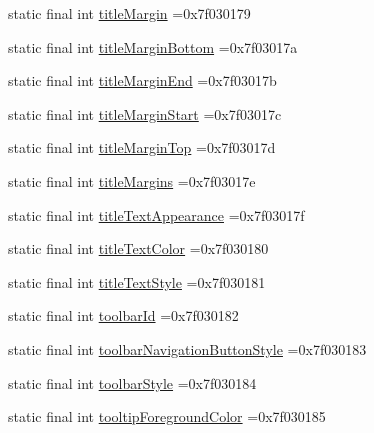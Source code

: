 \begin{DoxyCompactItemize}
\item 
static final int \mbox{\hyperlink{classbr_1_1unb_1_1cic_1_1mp_1_1marketmaster_1_1R_1_1attr_a3c2bfb7296e74462891e48241f37e746}{title\+Margin}} =0x7f030179
\item 
static final int \mbox{\hyperlink{classbr_1_1unb_1_1cic_1_1mp_1_1marketmaster_1_1R_1_1attr_a47cea5e8bc26abc7fbc9424066456482}{title\+Margin\+Bottom}} =0x7f03017a
\item 
static final int \mbox{\hyperlink{classbr_1_1unb_1_1cic_1_1mp_1_1marketmaster_1_1R_1_1attr_abb47aa2e5432b4a1cc7d5b433315b041}{title\+Margin\+End}} =0x7f03017b
\item 
static final int \mbox{\hyperlink{classbr_1_1unb_1_1cic_1_1mp_1_1marketmaster_1_1R_1_1attr_a3bf41232a2379106fa32ac158033098b}{title\+Margin\+Start}} =0x7f03017c
\item 
static final int \mbox{\hyperlink{classbr_1_1unb_1_1cic_1_1mp_1_1marketmaster_1_1R_1_1attr_a0fe9a45d12de8315bebca8482a15fcbc}{title\+Margin\+Top}} =0x7f03017d
\item 
static final int \mbox{\hyperlink{classbr_1_1unb_1_1cic_1_1mp_1_1marketmaster_1_1R_1_1attr_aca212091e0cade39f75c0c18d04422af}{title\+Margins}} =0x7f03017e
\item 
static final int \mbox{\hyperlink{classbr_1_1unb_1_1cic_1_1mp_1_1marketmaster_1_1R_1_1attr_ae11675c9705c6efc099dba56b6f0845e}{title\+Text\+Appearance}} =0x7f03017f
\item 
static final int \mbox{\hyperlink{classbr_1_1unb_1_1cic_1_1mp_1_1marketmaster_1_1R_1_1attr_af8a627c74e4cc23cfe884ab8d7ab1869}{title\+Text\+Color}} =0x7f030180
\item 
static final int \mbox{\hyperlink{classbr_1_1unb_1_1cic_1_1mp_1_1marketmaster_1_1R_1_1attr_a60fffac10e65d676b30b3853616c1203}{title\+Text\+Style}} =0x7f030181
\item 
static final int \mbox{\hyperlink{classbr_1_1unb_1_1cic_1_1mp_1_1marketmaster_1_1R_1_1attr_ae73648522ec7761fc26e7b4f6e7991b3}{toolbar\+Id}} =0x7f030182
\item 
static final int \mbox{\hyperlink{classbr_1_1unb_1_1cic_1_1mp_1_1marketmaster_1_1R_1_1attr_aba3523c01be71d077f5388eb3f67dc9b}{toolbar\+Navigation\+Button\+Style}} =0x7f030183
\item 
static final int \mbox{\hyperlink{classbr_1_1unb_1_1cic_1_1mp_1_1marketmaster_1_1R_1_1attr_a760ef6639f917a70a1e6b45a1c27f888}{toolbar\+Style}} =0x7f030184
\item 
static final int \mbox{\hyperlink{classbr_1_1unb_1_1cic_1_1mp_1_1marketmaster_1_1R_1_1attr_a8a0527da09571005328d20ef38412567}{tooltip\+Foreground\+Color}} =0x7f030185

\end{DoxyCompactItemize}
